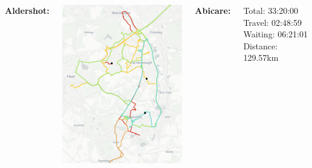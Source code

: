 \documentclass[usenames,dvipsnames]{beamer}
\begin{document}

\begin{frame} %
	\begin{columns}
		\begin{minipage}[c][0.05\textheight][c]{\linewidth}
			\hspace{37mm}
			\textbf{Aldershot:}
		\end{minipage}
		\begin{minipage}[c][0.7\textheight][c]{\linewidth}
			\centering
			\includegraphics[width=0.8\linewidth]{figures/05AldershotAbi2}
		\end{minipage}
		\begin{minipage}[c][0.2\textheight][c]{\linewidth}
			\scriptsize
			\hspace{17mm}\textbf{Abicare:}
			\begin{itemize}
				\setlength{\itemindent}{0.5in}
				\aitem Total: 33:20:00
				\aitem Travel: 02:48:59
				\aitem Waiting: 06:21:01
				\aitem Distance: 129.57km
			\end{itemize}
		\end{minipage}
		\begin{minipage}[c][0.05\textheight][c]{\linewidth}

\end{minipage}
\end{columns}
\end{frame}
\end{document}
